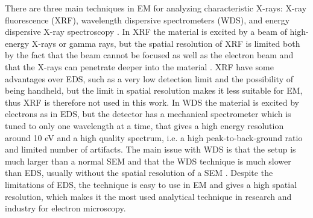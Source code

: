 There are three main techniques in EM for analyzing characteristic X-rays: X-ray fluorescence (XRF), wavelength dispersive spectrometers (WDS), and energy dispersive X-ray spectroscopy \cite{jenkins_xrayspectroscopy}.
In XRF the material is excited by a beam of high-energy X-rays or gamma rays, but the spatial resolution of XRF is limited both by the fact that the beam cannot be focused as well as the electron beam and that the X-rays can penetrate deeper into the material \cite{xrf_spatial_resolution}.
XRF have some advantages over EDS, such as a very low detection limit and the possibility of being handheld, but the limit in spatial resolution makes it less suitable for EM, thus XRF is therefore not used in this work.
In WDS the material is excited by electrons as in EDS, but the detector has a mechanical spectrometer which is tuned to only one wavelength at a time, that gives a high energy resolution around 10 eV and a high quality spectrum, i.e. a high peak-to-back-ground ratio and limited number of artifacts.
The main issue with WDS is that the setup is much larger than a normal SEM and that the WDS technique is much slower than EDS, usually without the spatial resolution of a SEM \cite{goldstein_scanning_2018}.
Despite the limitations of EDS, the technique is easy to use in EM and gives a high spatial resolution, which makes it the most used analytical technique in research and industry for electron microscopy.






